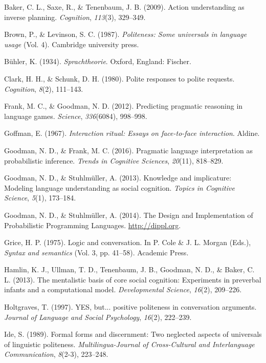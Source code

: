 \documentclass[floatsintext,mask,man]{apa6}
\theoremstyle{definition}
\theoremstyle{definition}
\theoremstyle{definition}
\theoremstyle{remark}
\begin{document}
\hypertarget{ref-baker2009action}{}
Baker, C. L., Saxe, R., \& Tenenbaum, J. B. (2009). Action understanding
as inverse planning. \emph{Cognition}, \emph{113}(3), 329--349.

\hypertarget{ref-brown1987}{}
Brown, P., \& Levinson, S. C. (1987). \emph{Politeness: Some universals
in language usage} (Vol. 4). Cambridge university press.

\hypertarget{ref-buhler1934}{}
Bühler, K. (1934). \emph{Sprachtheorie}. Oxford, England: Fischer.

\hypertarget{ref-clark1980}{}
Clark, H. H., \& Schunk, D. H. (1980). Polite responses to polite
requests. \emph{Cognition}, \emph{8}(2), 111--143.

\hypertarget{ref-frank2012}{}
Frank, M. C., \& Goodman, N. D. (2012). Predicting pragmatic reasoning
in language games. \emph{Science}, \emph{336}(6084), 998--998.

\hypertarget{ref-goffman1967}{}
Goffman, E. (1967). \emph{Interaction ritual: Essays on face-to-face
interaction}. Aldine.

\hypertarget{ref-goodman2016}{}
Goodman, N. D., \& Frank, M. C. (2016). Pragmatic language
interpretation as probabilistic inference. \emph{Trends in Cognitive
Sciences}, \emph{20}(11), 818--829.

\hypertarget{ref-goodman2013}{}
Goodman, N. D., \& Stuhlmüller, A. (2013). Knowledge and implicature:
Modeling language understanding as social cognition. \emph{Topics in
Cognitive Science}, \emph{5}(1), 173--184.

\hypertarget{ref-dippl}{}
Goodman, N. D., \& Stuhlmüller, A. (2014). The Design and Implementation
of Probabilistic Programming Languages. \url{http://dippl.org}.

\hypertarget{ref-grice1975}{}
Grice, H. P. (1975). Logic and conversation. In P. Cole \& J. L. Morgan
(Eds.), \emph{Syntax and semantics} (Vol. 3, pp. 41--58). Academic
Press.

\hypertarget{ref-hamlin2013mentalistic}{}
Hamlin, K. J., Ullman, T. D., Tenenbaum, J. B., Goodman, N. D., \&
Baker, C. L. (2013). The mentalistic basis of core social cognition:
Experiments in preverbal infants and a computational model.
\emph{Developmental Science}, \emph{16}(2), 209--226.

\hypertarget{ref-holtgraves1997}{}
Holtgraves, T. (1997). YES, but... positive politeness in conversation
arguments. \emph{Journal of Language and Social Psychology},
\emph{16}(2), 222--239.

\hypertarget{ref-ide1989}{}
Ide, S. (1989). Formal forms and discernment: Two neglected aspects of
universals of linguistic politeness. \emph{Multilingua-Journal of
Cross-Cultural and Interlanguage Communication}, \emph{8}(2-3),
223--248.
\end{document}
